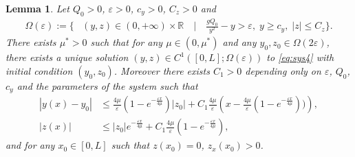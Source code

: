 \documentclass[10pt,a4paper]{amsart}
\newtheorem{lem}{Lemma}
\begin{document}
\begin{lem}
\label{lem:appendix}
Let $Q_{0}>0$, $\varepsilon>0$, $c_{y}>0$, $C_{z}>0$ and
\begin{equation}
\begin{split}
\Omega(\varepsilon) := \Big\{&(y,z)\in (0,+\infty)\times\mathbb{R} \quad \Big| \quad \frac{gQ_{0}}{y^{2}}-y>\varepsilon,\; y\geq c_{y},\; |z|\leq C_{z} \Big\}.
\end{split}
\end{equation}
There exists $\mu^{*}>0$ such that for any $\mu\in(0,\mu^{*})$ and any $y_{0},z_{0}\in \Omega(2\varepsilon)$, there exists a unique solution $(y,z)\in C^{1}([0,L];\Omega(\varepsilon))$ to \eqref{eq:sys4} with initial condition $(y_{0},z_{0})$. Moreover there exists $C_{1}>0$ depending only on $\varepsilon$, $Q_{0}$, $c_{y}$ and the parameters of the system such that 
\begin{equation}
\label{eq:estimyz}
\begin{split}
|y(x)-y_{0}|&\leq \frac{4\mu}{\varepsilon}\left(1-e^{-\frac{\varepsilon x}{4\mu}}\right)|z_{0}| + C_{1}\frac{4\mu}{\varepsilon}\left(x-\frac{4\mu}{\varepsilon}(1-e^{-\frac{\varepsilon x}{4\mu}}))\right),\\
|z(x)|&\leq  |z_{0}| e^{-\frac{\varepsilon x}{4\mu}}+ C_{1}\frac{4\mu}{\varepsilon}(1-e^{-\frac{\varepsilon x}{4\mu}}),
\end{split}
\end{equation}
{and for any $x_{0}\in[0,L]$ such that $z(x_{0})=0$, $z_{x}(x_{0})>0$.}
\end{lem}
\end{document}
